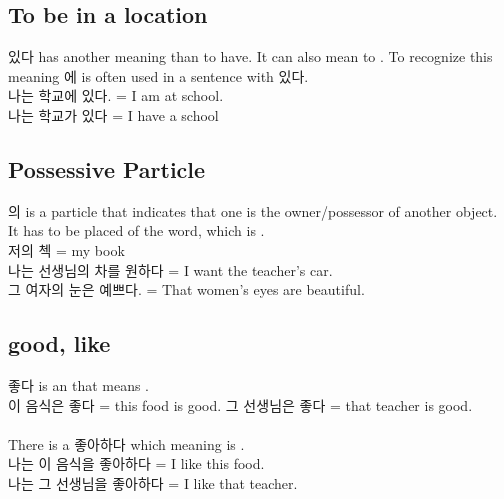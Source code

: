 \subsection{To be in a location}
\begin{Korean}
있다 has another meaning than to have. It can also mean to . To recognize this meaning 에 is often used in a sentence with 있다.\\
나는 학교에 있다. = I am at school.\\
나는 학교가 있다  = I have a school\\
\end{Korean}

\subsection{Possessive Particle}
\begin{Korean}
의 is a particle that indicates that one is the owner/possessor of another object. It has to be placed  of the word, which is .\\
저의 첵 = my book\\
나는 선생님의 차를 원하다 = I want the teacher's car.\\
그 여자의 눈은 예쁘다. = That women's eyes are beautiful.
\end{Korean}

\subsection{good, like}
\begin{Korean}
좋다 is an  that means .\\
이 음식은 좋다 = this food is good.
그 선생님은 좋다 = that teacher is good.\\
\\
There is a  좋아하다 which meaning is .\\
나는 이 음식을 좋아하다 = I like this food.\\
나는 그 선생님을 좋아하다 = I like that teacher.
\end{Korean} 


